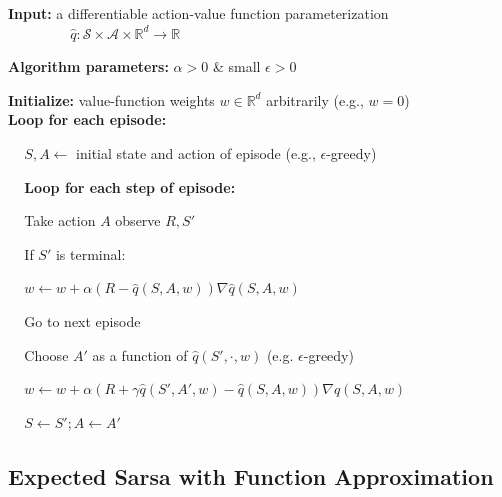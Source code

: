 \documentclass[12pt, a4paper]{article}
\begin{document}
\begin{tcolorbox}[title={Episodic Semi-gradient Sarsa for Estimating $\hat{q} \approx q_*$}]

\textbf{Input:} a differentiable action-value function parameterization $ \;\;\;\;\;\;\;\;\;\;\;\;\;\;\;\; \hat{q}: \mathcal{S} \times \mathcal{A} \times \mathbb{R}^d \rightarrow \mathbb{R}$

\textbf{Algorithm parameters:} $\alpha > 0$ \& small $\epsilon > 0$

\textbf{Initialize:} value-function weights $w \in \mathbb{R}^d$ arbitrarily (e.g., $w=0$) \\

\textbf{Loop for each episode:}
\begin{description}
   \item $\;\;\;$ $S, A \leftarrow$ initial state and action of episode (e.g., $\epsilon$-greedy)
   \item $\;\;\;$ \textbf{Loop for each step of episode:}
   \begin{description}
     \item $\;\;\;$ Take action $A$ observe $R, S'$
     \item $\;\;\;$ If $S'$ is terminal:
     \begin{description}
       \item $\;\;\;$ $w \leftarrow w + \alpha (R - \hat{q}(S,A,w))\nabla \hat{q}(S,A,w)$
       \item $\;\;\;$ Go to next episode
     \end{description}
     \item $\;\;\;$ Choose $A'$ as a function of $\hat{q}(S',\cdot,w)$ (e.g. $\epsilon$-greedy)
     \item $\;\;\;$ $w \leftarrow w + \alpha (R + \gamma \hat{q}(S',A',w) - \hat{q}(S,A,w))\nabla \hat{q}(S,A,w)$
     \item $\;\;\;$ $S \leftarrow S'; A \leftarrow A'$
   \end{description}
\end{description}
\end{tcolorbox}







\subsection{Expected Sarsa with Function Approximation}\label{episodic-sarsa-with-function-approximation}
\end{document}
